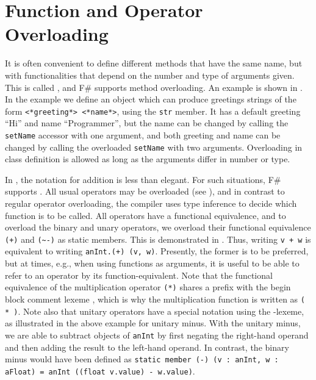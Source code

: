 \section{Function and Operator Overloading}
It is often convenient to define different methods that have the same name, but with functionalities that depend on the number and type of arguments given. This is called , and F\# supports method overloading. An example is shown in .
%
% 
In the example we define an object which can produce greetings strings of the form \lstinline[language=syntax]{<*greeting*> <*name*>}, using the \lstinline{str} member. It has a default greeting ``Hi'' and name ``Programmer'', but the name can be changed by calling the \lstinline{setName} accessor with one argument, and both greeting and name can be changed by calling the overloaded \lstinline{setName} with two arguments. Overloading in class definition is allowed as long as the arguments differ in number or type.

In , the notation for addition is less than elegant. For such situations, F\# supports . All usual operators may be overloaded (see ), and in contrast to regular operator overloading, the compiler uses type inference to decide which function is to be called. All operators have a functional equivalence, and to overload the binary \lexeme{+} and unary \lexeme{-} operators, we overload their functional equivalence \lstinline{(+)} and \lstinline{(~-)} as static members. This is demonstrated in .
%
% 
Thus, writing \lstinline{v + w} is equivalent to writing \lstinline{anInt.(+) (v, w)}. Presently, the former is to be preferred, but at times, e.g., when using functions as arguments, it is useful to be able to refer to an operator by its function-equivalent. Note that the functional equivalence of the multiplication operator \lstinline{(*)} shares a  prefix with the begin block comment lexeme \lexeme{(*}, which is why the multiplication function is written as \lstinline{( * )}. Note also that unitary operators have a special notation using the \lexeme{\~}-lexeme, as illustrated in the above example for unitary minus. With the unitary minus, we are able to subtract objects of \lstinline{anInt} by first negating the right-hand operand and then adding the result to the left-hand operand. In contrast, the binary minus would have been defined as \lstinline{static member (-) (v : anInt, w : aFloat) = anInt ((float v.value) - w.value)}.

